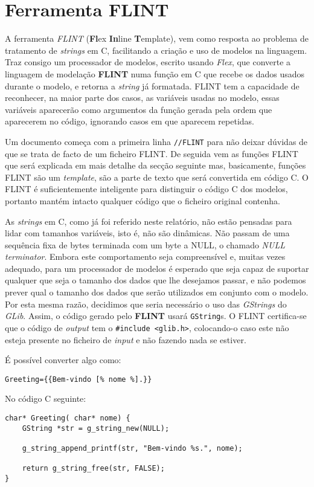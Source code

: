 \chapter{Ferramenta FLINT}
A ferramenta \emph{FLINT} (\textbf{Fl}ex \textbf{In}line \textbf{T}emplate), vem como resposta ao problema de tratamento de \textit{strings} em C, facilitando a criação e uso de modelos na linguagem. Traz consigo um processador de modelos, escrito usando \emph{Flex}, que converte a linguagem de modelação \textbf{FLINT} numa função em C que recebe os dados usados durante o modelo, e retorna a \textit{string} já formatada. FLINT tem a capacidade de reconhecer, na maior parte dos casos, as variáveis usadas no modelo, essas variáveis aparecerão como argumentos da função gerada pela ordem que aparecerem no código, ignorando casos em que aparecem repetidas.

Um documento começa com a primeira linha \texttt{//FLINT} para não deixar dúvidas de que se trata de facto de um ficheiro FLINT. De seguida vem as funções FLINT que será explicada em mais detalhe da secção seguinte mas, basicamente, funções FLINT são um \textit{template}, são a parte de texto que será convertida em código C. O FLINT é suficientemente inteligente para distinguir o código C dos modelos, portanto mantém intacto qualquer código que o ficheiro original contenha.

As \textit{strings} em C, como já foi referido neste relatório, não estão pensadas para lidar com tamanhos variáveis, isto é, não são dinâmicas. Não passam de uma sequência fixa de bytes terminada com um byte a NULL, o chamado \textit{NULL terminator}. Embora este comportamento seja compreensível e, muitas vezes adequado, para um processador de modelos é esperado que seja capaz de suportar qualquer que seja o tamanho dos dados que lhe desejamos passar, e não podemos prever qual o tamanho dos dados que serão utilizados em conjunto com o modelo. Por esta mesma razão, decidimos que seria necessário o uso das \emph{GStrings} do \emph{GLib}. Assim, o código gerado pelo \textbf{FLINT} usará \texttt{GString}s. O FLINT certifica-se que o código de \textit{output} tem o \texttt{\#include <glib.h>}, colocando-o caso este não esteja presente no ficheiro de \textit{input} e não fazendo nada se estiver.


É possível converter algo como:
\begin{lstlisting}
Greeting={{Bem-vindo [% nome %].}} 
\end{lstlisting}
No código C seguinte:
\
\begin{lstlisting}[float,floatplacement=H]
char* Greeting( char* nome) {
    GString *str = g_string_new(NULL);
    
    g_string_append_printf(str, "Bem-vindo %s.", nome);
    
    return g_string_free(str, FALSE);
}
\end{lstlisting}

